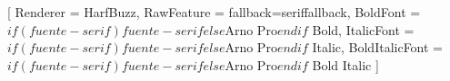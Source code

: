 %
%
%
%
%
%
%
%

\usepackage{fontspec}


\setmainfont{$if(fuente-serif)$$fuente-serif$$else$Arno Pro$endif$}[
  Renderer       = HarfBuzz,
  RawFeature     = {fallback=seriffallback},
  BoldFont       = {$if(fuente-serif)$$fuente-serif$$else$Arno Pro$endif$ Bold},
  ItalicFont     = {$if(fuente-serif)$$fuente-serif$$else$Arno Pro$endif$ Italic},
  BoldItalicFont = {$if(fuente-serif)$$fuente-serif$$else$Arno Pro$endif$ Bold Italic}
]

